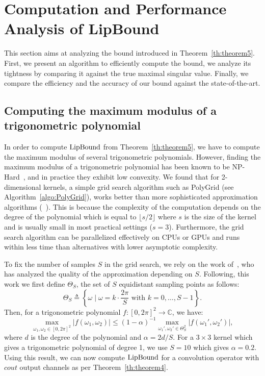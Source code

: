 \section{Computation and Performance Analysis of LipBound}
\label{sec:computation_performance_lipbound}

This section aims at analyzing the bound introduced in Theorem~\ref{th:theorem5}.
First, we present an algorithm to efficiently compute the bound, we analyze its tightness by comparing it against the true maximal singular value.
Finally, we compare the efficiency and the accuracy of our bound against the state-of-the-art. 

\subsection{Computing the maximum modulus of a trigonometric polynomial}\label{subsec:computing_max_modulus_trig_polynomial}


In order to compute $\operatorname{LipBound}$ from Theorem~\ref{th:theorem5}, we have to compute the maximum modulus of several trigonometric polynomials.
However, finding the maximum modulus of a trigonometric polynomial has been known to be NP-Hard~\cite{pfister2018bounding}, and in practice they exhibit low convexity.
We found that for 2-dimensional kernels, a simple grid search algorithm such as PolyGrid (see Algorithm~\ref{algo:PolyGrid}), works better than more sophisticated approximation algorithms (\eg ~\citet{green1999calculating,de2009finding}).
This is because the complexity of the computation depends on the degree of the polynomial which is equal to $\lfloor s / 2 \rfloor$ where $s$ is the size of the kernel and is usually small in most practical settings (\eg $s=3$).
Furthermore, the grid search algorithm can be parallelized effectively on CPUs or GPUs and runs within less time than alternatives with lower asymptotic complexity. 

To fix the number of samples $S$ in the grid search, we rely on the work of~\cite{pfister2018bounding}, who has analyzed the quality of the approximation depending on $S$.
Following, this work we first define $\Theta_S$, the set of $S$ equidistant sampling points as follows:
\begin{equation}
  \Theta_S \triangleq \left\{ \omega \mid \omega = k \cdot \frac{2\pi}{S} \mbox{ with }  k = 0,\ldots, S-1 \right\}.
\end{equation}
Then, for a trigonometric polynomial $f: [0, 2\pi]^2 \rightarrow \mathbb{C}$, we have:
\begin{equation}
  \max_{\omega_1, \omega_2 \in [0,2\pi]^2} \left| f(\omega_1, \omega_2) \right| \leq (1 - \alpha)^{-1} \max_{\omega_1', \omega_2' \in \Theta_S^2} \left| f(\omega_1', \omega_2') \right|,
\end{equation}
where $d$ is the degree of the polynomial and $\alpha = 2d / S$.
For a $3\times3$ kernel which gives a trigonometric polynomial of degree 1, we use $S = 10$ which gives $\alpha = 0.2$.
Using this result, we can now compute $\operatorname{LipBound}$ for a convolution operator with $cout$ output channels as per Theorem~\ref{th:theorem4}.
 
